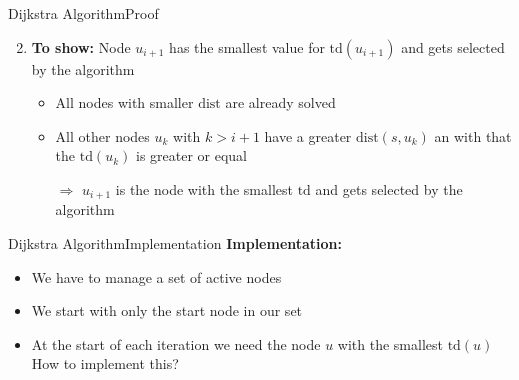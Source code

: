 \begin{frame}{Dijkstra Algorithm}{Proof}
  \begin{figure}[!h]
    \begin{adjustbox}{width=0.9\linewidth}
      \def\DijkstraTD{1}%
      
    \end{adjustbox}
  \end{figure}
  \begin{enumerate}
    \setcounter{enumi}{1}
    \item
      \textbf{To show:} Node {\color{Mittel-Blau}$u_{i+1}$} has the smallest
      value for {\color{Mittel-Blau}$\mathrm{td}(u_{i+1})$} and gets selected by
      the algorithm
      \begin{itemize}
        \item
          All nodes with smaller {\color{Mittel-Blau}$\mathrm{dist}$} are
          already solved
        \item
          All other nodes {\color{Mittel-Blau}$u_k$} with
          {\color{Mittel-Blau}$k > i + 1$} have a greater
          {\color{Mittel-Blau}$\mathrm{dist}(s, u_k)$}
          an with that the  {\color{Mittel-Blau}$\mathrm{td}(u_k)$} is greater
          or equal
        \item[$\Rightarrow$]
          {\color{Mittel-Blau}$u_{i+1}$} is the node with the
          smallest {\color{Mittel-Blau}$\mathrm{td}$} and gets selected by the
          algorithm
      \end{itemize}
  \end{enumerate}
\end{frame}


\begin{frame}{Dijkstra Algorithm}{Implementation}
  \textbf{Implementation:}
  \begin{itemize}
    \item
      We have to manage a set of {\color{Mittel-Blau}active nodes}
    \item
      We start with only the {\color{Mittel-Blau}start node} in our set
    \item
      At the start of each iteration we need the node
      {\color{Mittel-Blau}$u$} with the smallest
      {\color{Mittel-Blau}$\mathrm{td}(u)$}\\[0.5em]
      {\color{gray}How to implement this?}
  \end{itemize}
\end{frame}

